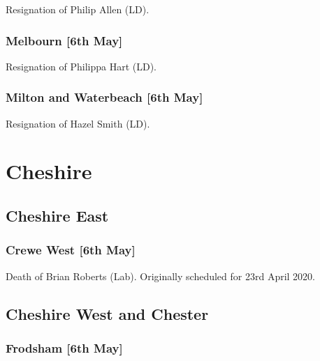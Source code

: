 \documentclass[a4paper,openany]{book}
\begin{document}
\begin{resultsiii}
Resignation of Philip Allen (LD).

\subsubsection*{Melbourn \hspace*{\fill}\nolinebreak[1]%
	\enspace\hspace*{\fill}
	[6th May]}


Resignation of Philippa Hart (LD).

\subsubsection*{Milton and Waterbeach \hspace*{\fill}\nolinebreak[1]%
	\enspace\hspace*{\fill}
	[6th May]}


Resignation of Hazel Smith (LD).

\section{Cheshire}

\subsection*{Cheshire East}

\subsubsection*{Crewe West \hspace*{\fill}\nolinebreak[1]%
	\enspace\hspace*{\fill}
	[6th May]}


Death of Brian Roberts (Lab).  Originally scheduled for 23rd April 2020.

\subsection*{Cheshire West and Chester}

\subsubsection*{Frodsham \hspace*{\fill}\nolinebreak[1]%
	\enspace\hspace*{\fill}
	[6th May]}


\end{resultsiii}
\end{document}
